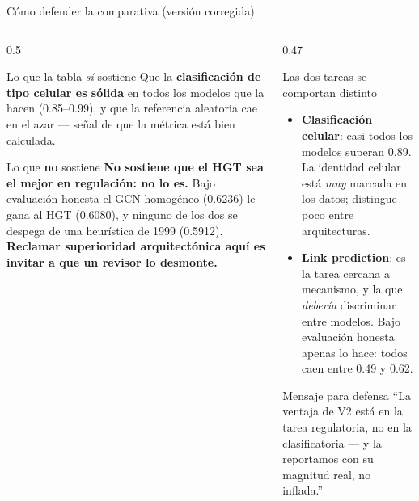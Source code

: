 \begin{frame}{C\'omo defender la comparativa (versi\'on corregida)}
  \begin{columns}[T]
    \begin{column}{0.5\textwidth}
      \begin{block}{Lo que la tabla \emph{s\'i} sostiene}
        \small
        Que la \textbf{clasificaci\'on de tipo celular es s\'olida} en todos los modelos que
        la hacen (0.85--0.99), y que la referencia aleatoria cae en el azar --- se\~nal de que
        la m\'etrica est\'a bien calculada.
      \end{block}
      \begin{block}{Lo que \textbf{no} sostiene}
        \small
        \textbf{No sostiene que el HGT sea el mejor en regulaci\'on: no lo es.} Bajo
        evaluaci\'on honesta el GCN homog\'eneo (0.6236) le gana al HGT (0.6080), y ninguno
        de los dos se despega de una heur\'istica de 1999 (0.5912). \textbf{Reclamar
        superioridad arquitect\'onica aqu\'i es invitar a que un revisor lo desmonte.}
      \end{block}
    \end{column}
    \begin{column}{0.47\textwidth}
      \begin{block}{Las dos tareas se comportan distinto}
        \small
        \begin{itemize}
          \item \textbf{Clasificaci\'on celular}: casi todos los modelos superan 0.89. La identidad celular est\'a \emph{muy} marcada en los datos; distingue poco entre arquitecturas.
          \item \textbf{Link prediction}: es la tarea cercana a mecanismo, y la que \emph{deber\'ia} discriminar entre modelos. Bajo evaluaci\'on honesta apenas lo hace: todos caen entre 0.49 y 0.62.
        \end{itemize}
      \end{block}
      \vspace{0.2em}
      \begin{block}{Mensaje para defensa}
        \scriptsize
        ``La ventaja de V2 est\'a en la tarea regulatoria, no en la clasificatoria --- y la reportamos con su magnitud real, no inflada.''
      \end{block}
    \end{column}
  \end{columns}
\end{frame}


